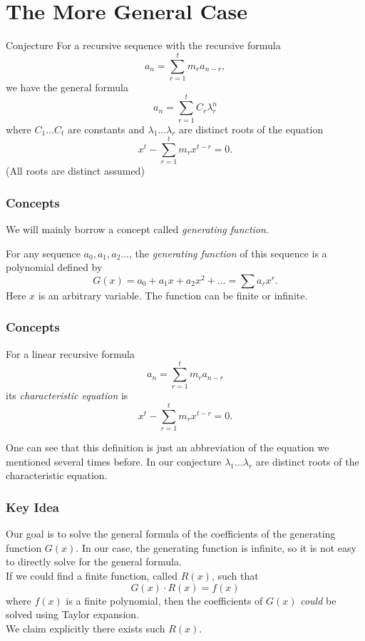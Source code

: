 \documentclass{beamer}
\theoremstyle{definition}
\theoremstyle{remark}
\begin{document}
\section{The More General Case}
\begin{frame} 
  \begin{block}{Conjecture}
     For a recursive sequence with the recursive formula \[
      a_n = \sum_{r=1}^t m_r a_{n-r},
     \]
     we have the general formula \[
       a_n = \sum_{r=1}^{t} C_r \lambda_r^n 
     \]
     where $C_1\dots C_t$ are constants and $\lambda_1\dots \lambda_r$
     are distinct roots of the equation \[
       x^t - \sum_{r=1}^t m_r x^{t-r} = 0.
     \] (All roots are distinct assumed)
  \end{block}
\end{frame}
\begin{frame}
  \frametitle{Concepts}
  We will mainly borrow a concept called \emph{generating function}. 
  \begin{definition}
    For any sequence $a_0, a_1, a_2 \dots$, the \emph{generating function}
    of this sequence is a polynomial defined by \[
      G(x) = a_0 + a_1 x + a_2 x^2 + \dots = \sum a_r x^r.
    \]
    Here $x$ is an arbitrary variable. 
    The function can be finite or infinite.
  \end{definition}
\end{frame}
\begin{frame}
  \frametitle{Concepts}
  \begin{definition}
    For a linear recursive formula \[
       a_n = \sum_{r=1}^t m_r a_{n-r}
    \] its \emph{characteristic equation} is \[
      x^t - \sum_{r=1}^t m_r x^{t-r} = 0.
    \]
  \end{definition}
  One can see that this definition is just an 
  abbreviation of the equation we mentioned 
  several times before. In our conjecture 
  $\lambda_1 \dots \lambda_r$ are distinct
  roots of the characteristic equation.
\end{frame}
\begin{frame}
  \frametitle{Key Idea}
  Our goal is to solve the general formula of the 
  coefficients of the generating function $G(x)$.
  In our case, the generating function is infinite, 
  so it is not easy to directly solve for the general formula. 
  \\
  If we could find a finite function, called $R(x)$, such 
  that \[
    G(x)\cdot R(x) = f(x)
  \] where $f(x)$ is a finite polynomial, then the coefficients 
  of $G(x)$ \textit{could} be solved using Taylor expansion. 
 \\
  We claim explicitly there exists such $R(x)$.
\end{frame}
\end{document}
